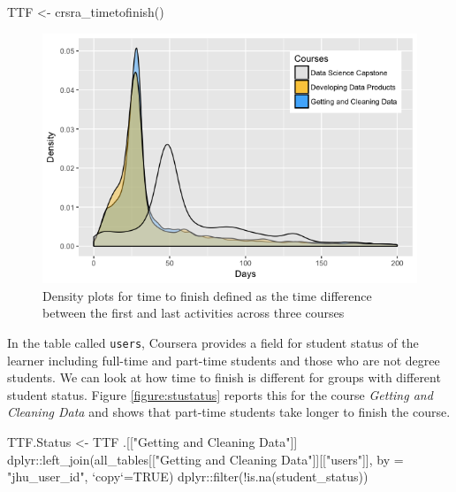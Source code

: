 \begin{Schunk}
\begin{Sinput}
TTF <- crsra_timetofinish()
\end{Sinput}
\end{Schunk}

\begin{figure}[htbp]
    \centering
    \includegraphics[scale=0.5]{timetofinish}
    \caption{Density plots for time to finish defined as the time difference between the first and last activities across three courses}
    \label{figure:timetofinish}
\end{figure}

In the table called \texttt{users}, Coursera provides a field for
student status of the learner including full-time and part-time students
and those who are not degree students. We can look at how time to finish
is different for groups with different student status. Figure
\ref{figure:stustatus} reports this for the course \emph{Getting and
Cleaning Data} and shows that part-time students take longer to finish
the course.

\begin{Schunk}
\begin{Sinput}
TTF.Status <- TTF %
    .[["Getting and Cleaning Data"]] %
    dplyr::left_join(all_tables[["Getting and Cleaning Data"]][["users"]], 
                     by = "jhu_user_id", `copy`=TRUE) %
    dplyr::filter(!is.na(student_status))
\end{Sinput}
\end{Schunk}

